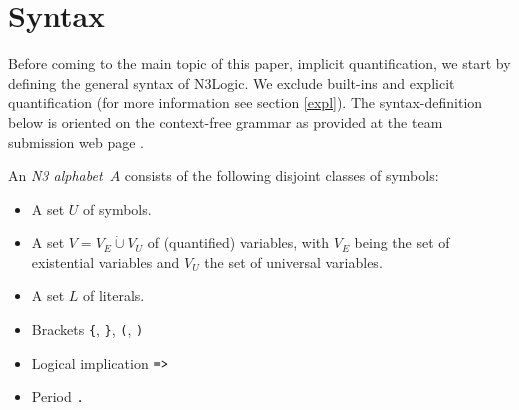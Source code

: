 
\section{Syntax}
Before coming to the main topic of this paper, implicit quantification, we start by defining the general syntax of N3Logic. We exclude built-ins %
and explicit quantification (for more information see section \ref{expl}). %
The syntax-definition below is oriented on the context-free grammar as provided at the team submission web page \cite{Notation3}. 


\begin{definition}\label{voc}
An \emph{N3 alphabet~$A$} consists of the following disjoint classes of symbols:
\begin{itemize}
\item A set $U$ of \uri symbols.
\item A set $V=V_E\mathbin{\dot{\cup}} V_U$  of (quantified) variables, with $V_E$ being the set of existential variables
and $V_U$ the set of universal variables.
\item A set $L$  of literals.
\item Brackets \verb!{!, \verb!}!, \verb!(!, \verb!)!
\item Logical implication $\verb!=>!$ 
\item Period \verb!.!
\end{itemize}
\end{definition}


